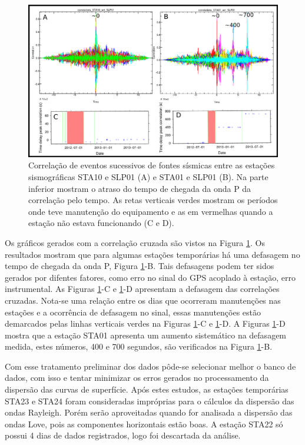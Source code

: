 \begin{figure}[!ht]
\centering
\includegraphics[scale=0.3]{Figs/correlacao_tempo_de_chegada_resultado.png}
\caption[Correlação de eventos sucessivos de fontes sísmicas entre duas estações sismográficas]{Correlação de eventos sucessivos de fontes sísmicas entre as estações sismográficas STA10 e SLP01 (A) e  STA01 e SLP01 (B). Na parte inferior mostram o atraso do tempo de chegada da onda P da correlação pelo tempo. As retas verticais verdes mostram os períodos onde teve manutenção do equipamento e as em vermelhas quando a estação não estava funcionando (C e D).}
\label{teste_tempo_results}
\end{figure}

Os gráficos gerados com a correlação cruzada são vistos na Figura \ref{teste_tempo_results}. Os resultados mostram que para algumas estações temporárias há uma defasagem no tempo de chegada da onda P, Figura \ref{teste_tempo_results}-B. Tais defasagens podem ter sidos gerados por difentes fatores, como erro no sinal do GPS acoplado à estação, erro instrumental. As Figuras \ref{teste_tempo_results}-C e \ref{teste_tempo_results}-D apresentam a defasagem das correlações cruzadas. Nota-se uma relação entre os  dias que ocorreram manutenções nas estações  e a ocorrência de defasagem no sinal, essas manutenções estão demarcados pelas linhas verticais verdes na Figuras \ref{teste_tempo_results}-C e \ref{teste_tempo_results}-D. A Figuras \ref{teste_tempo_results}-D mostra que a estação STA01 apresenta um aumento sistemático na defasagem medida, estes números, 400 e 700 segundos, são verificados na Figura \ref{teste_tempo_results}-B.

Com esse tratamento preliminar dos dados pôde-se selecionar melhor o banco de dados, com isso  e tentar minimizar os erros gerados no processamento da dispersão das curvas de superfície. Após estes estudos, as estações temporárias STA23 e STA24 foram consideradas impróprias para o cálculos da dispersão das ondas Rayleigh. Porém serão aproveitadas quando for analisada a dispersão das ondas Love, pois as componentes horizontais estão boas. A estação STA22 só possui 4 dias de dados registrados, logo foi descartada da análise.
